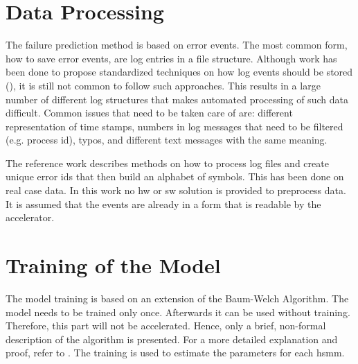 \documentclass[mscthesis]{usiinfthesis}
\begin{document}
\section{Data Processing}
\label{ch:event_data}

The failure prediction method is based on error events. The most common form,
how to save error events, are log entries in a file structure. Although work has
been done to propose standardized techniques on how log events should be stored
(\cite{IPDPS04_Salfner, DSN09_Ziming}), it is still not common to follow such
approaches. This results in a large number of different log structures that
makes automated processing of such data difficult. Common issues that need to
be taken care of are: different representation of time stamps, numbers in log
messages that need to be filtered (e.g. process id), typos, and different text
messages with the same meaning.

The reference work \cite{salfner08} describes methods on how to process log
files and create unique error ids that then build an alphabet of symbols. This
has been done on real case data. In this work no \gls{hw} or \gls{sw} solution
is provided to preprocess data. It is assumed that the events are already in
a form that is readable by the accelerator.

\section{Training of the Model}
\label{ch:event_train}

The model training is based on an extension of the Baum-Welch Algorithm. The
model needs to be trained only once. Afterwards it can be used without
training. Therefore, this part will not be accelerated. Hence, only a brief,
non-formal description of the algorithm is presented. For a more detailed
explanation and proof, refer to \cite{salfner08}. The training is used to
estimate the parameters for each \gls{hsmm}.
\end{document}
